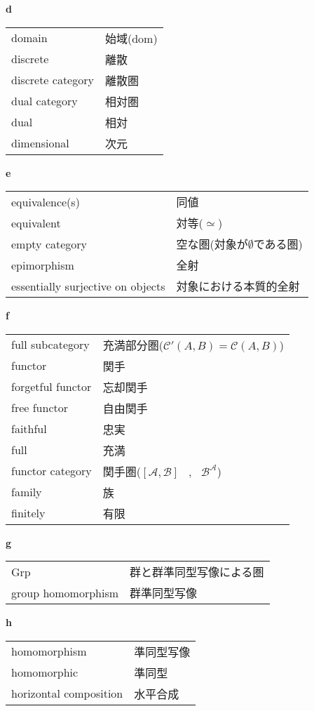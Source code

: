 \documentclass[dvipdfmx]{jsarticle}
\begin{document}
\textbf{d}

  \begin{tabular}{ll}
    domain & 始域($\mathrm{dom}$) \\
    discrete & 離散 \\
    discrete category & 離散圏 \\
    dual category & 相対圏 \\
    dual & 相対 \\
    dimensional & 次元 \\
  \end{tabular}

\textbf{e}

  \begin{tabular}{ll}
    equivalence(s) & 同値 \\
    equivalent & 対等($\simeq$) \\
    empty category & 空な圏(対象が$\emptyset$である圏) \\
    epimorphism & 全射 \\
    essentially surjective on objects & 対象における本質的全射 \\
  \end{tabular}

\textbf{f}

  \begin{tabular}{ll}
    full subcategory & 充満部分圏($\mathscr{C}'(A,B) = \mathscr{C}(A,B)$) \\
    functor & 関手 \\
    forgetful functor & 忘却関手 \\
    free functor & 自由関手 \\
    faithful & 忠実 \\
    full & 充満 \\
    functor category & 関手圏($[\mathscr{A},\mathscr{B}]$ \, , \, $\mathscr{B^{\mathscr{A}}}$) \\
    family & 族 \\
    finitely & 有限 \\
  \end{tabular}

\textbf{g}

  \begin{tabular}{ll}
    Grp & 群と群準同型写像による圏 \\
    group homomorphism & 群準同型写像 \\
  \end{tabular}

\textbf{h}

  \begin{tabular}{ll}
    homomorphism & 準同型写像 \\
    homomorphic & 準同型 \\
    horizontal composition & 水平合成 \\
  \end{tabular}
\end{document}
